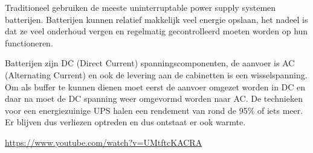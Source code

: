 Traditioneel gebruiken de meeste uninterruptable power supply systemen batterijen. Batterijen kunnen relatief makkelijk veel energie opslaan, het nadeel is dat ze veel onderhoud vergen en regelmatig gecontrolleerd moeten worden op hun functioneren.

Batterijen zijn DC (Direct Current) spanningscomponenten, de aanvoer is AC (Alternating Current) en ook de levering aan de cabinetten is een wisselspanning. Om als buffer te kunnen dienen moet eerst de aanvoer omgezet worden in DC en daar na moet de DC spanning weer omgevormd worden naar AC. De technieken voor een energiezuinige UPS halen een rendement van rond de 95\% of iets meer. Er blijven dus verliezen optreden en dus ontstaat er ook warmte.

\url{https://www.youtube.com/watch?v=UMtftcKACRA}


